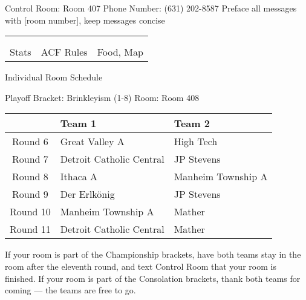\documentclass{article}%
\begin{document}
\newline%
Control Room: Room 407\newline%
Phone Number: (631) 202{-}8587\newline%
Preface all messages with {[}room number{]}, keep messages concise%
\vspace*{30pt}%
\newline%
%
\begin{tabularx}{\textwidth}{YYY}%
  &  &  \\%
\\%
Stats&ACF Rules&Food, Map\\%
\end{tabularx}%
\newpage%
\begin{center}%
\begin{Huge}%
Individual Room Schedule%
\end{Huge}%
\vspace*{16pt}%
\linebreak%
\begin{Large}%
Playoff Bracket: Brinkleyism (1-8) \hfill Room: Room 408%
\end{Large}%
\end{center}%
%
\begin{tabularx}{\textwidth}{|c|Y|Y|}%
\hline%
&Team 1&Team 2\\%
\hline%
Round 6&Great Valley A&High Tech\\%
Round 7&Detroit Catholic Central&JP Stevens\\%
Round 8&Ithaca A&Manheim Township A\\%
Round 9&Der Erlkönig&JP Stevens\\%
Round 10&Manheim Township A&Mather\\%
Round 11&Detroit Catholic Central&Mather\\%
\hline%
\end{tabularx}%
\vspace*{16pt}%
\linebreak%
If your room is part of the Championship brackets, have both teams stay in the room after the eleventh round, and text Control Room that your room is finished.\newline%
\newline%
If your room is part of the Consolation brackets, thank both teams for coming — the teams are free to go.\newline%
\end{document}

